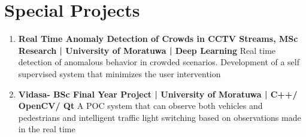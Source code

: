 \documentclass[letterpaper]{twentysecondcv} %
\begin{document}
\begin{twenty}
{\begin{itemize}
	\end{itemize}
	
}



\end{twenty}

\noindent
\begin{twenty}

\end{twenty}

\section{Special Projects}
\newline
\begin{enumerate}
    \item \textbf{Real Time Anomaly Detection of Crowds in CCTV Streams, MSc Research | University of Moratuwa | Deep Learning}
    \newline \newline
    Real time detection of anomalous behavior in crowded scenarios. Development of a self supervised system that minimizes the user intervention
\item \textbf{Vidasa- BSc  Final Year Project | University of Moratuwa | C++/ OpenCV/ Qt}
    \newline \newline   
    A POC system that can observe both vehicles and pedestrians and intelligent traffic light switching based on observations made in the real time


\end{enumerate}
\end{document}
